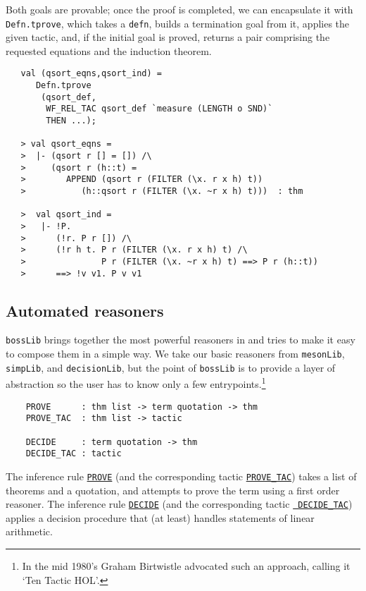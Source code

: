 Both goals are provable; once the proof is completed, we can encapsulate
it with {\small\verb+Defn.tprove+}, which takes a
{\small\verb+defn+}, builds a termination goal from it, applies the
given tactic, and, if the initial goal is proved, returns a pair
comprising the requested equations and the induction theorem.

\begin{verbatim}
   val (qsort_eqns,qsort_ind) =
      Defn.tprove
       (qsort_def,
        WF_REL_TAC qsort_def `measure (LENGTH o SND)`
        THEN ...);

   > val qsort_eqns =
   >  |- (qsort r [] = []) /\
   >     (qsort r (h::t) =
   >        APPEND (qsort r (FILTER (\x. r x h) t))
   >           (h::qsort r (FILTER (\x. ~r x h) t)))  : thm

   >  val qsort_ind =
   >   |- !P.
   >      (!r. P r []) /\
   >      (!r h t. P r (FILTER (\x. r x h) t) /\
   >               P r (FILTER (\x. ~r x h) t) ==> P r (h::t))
   >      ==> !v v1. P v v1
\end{verbatim}

\subsection{Automated reasoners}

\verb+bossLib+ brings together the most powerful reasoners in \holn{} and
tries to make it easy to compose them in a simple way. We take our basic
reasoners from \verb+mesonLib+, \verb+simpLib+, and \verb+decisionLib+,
but the point of \verb+bossLib+ is to provide a layer of abstraction so
the user has to know only a few entrypoints.\footnote{In the mid 1980's
Graham Birtwistle advocated such an approach, calling it `Ten Tactic
HOL'.}

\begin{verbatim}
    PROVE      : thm list -> term quotation -> thm
    PROVE_TAC  : thm list -> tactic

    DECIDE     : term quotation -> thm
    DECIDE_TAC : tactic
\end{verbatim}

The inference rule \underline{\tt PROVE} (and the corresponding tactic
\underline{\tt PROVE\_TAC}) takes a list of theorems and a quotation, and
attempts to prove the term using a first order reasoner. The inference
rule \underline{\tt DECIDE} (and the corresponding tactic \underline{\tt
DECIDE\_TAC}) applies a decision procedure that (at least) handles
statements of linear arithmetic.

